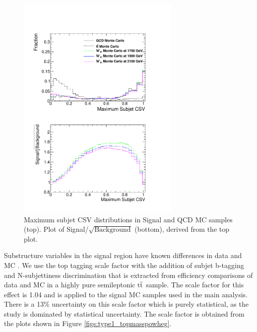 \begin{figure}[htcb]
\begin{center}
\includegraphics[width=0.7\textwidth]{AN-13-004/figs/bmaxCompqcdandsignal.pdf}
\caption{
Maximum subjet CSV distributions in Signal and QCD MC samples (top).  Plot of Signal/$\sqrt{\text{Background}}$ (bottom), derived from the top plot. 
}
\label{figs:BtagCOMP}
\end{center}
\end{figure}

Substructure variables in the signal region have known differences in data and MC \cite{JME13007}.  
We use the top tagging scale factor with the addition of subjet b-tagging and N-subjettiness discrimination that is extracted 
from efficiency comparisons of data and MC in a highly pure semileptonic $\mathrm{t\overline{t}}$ sample.   
The scale factor for this effect is 1.04 and is applied to the signal MC samples used in the main analysis.  
There is a 13\% uncertainty on this scale factor which is purely statistical, as the study is dominated by statistical uncertainty.  
The scale factor is obtained from the plots shown in Figure \ref{figs:type1_topmasspowheg}.

